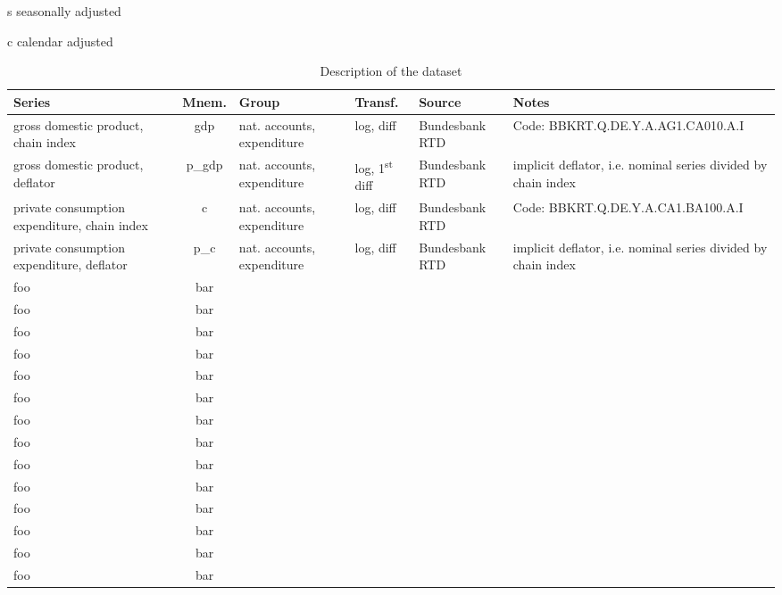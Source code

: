 \documentclass[notitlepage,a4paper,12pt]{article}
\begin{document}
\begingroup\fontsize{8}{10}\selectfont
\begin{ThreePartTable}
    \begin{TableNotes}
    \item[s] seasonally adjusted
    \item[c] calendar adjusted
    \end{TableNotes}
\begin{landscape}
\begin{longtable}{| l | c | l | l | l | l |} 
    \caption{Description of the dataset} \\%
    \toprule
    \rowcolor{gray!50}
    \textbf{Series} & \textbf{Mnem.} &  \textbf{Group} & \textbf{Transf.} & \textbf{Source} & \textbf{Notes} \\
    \midrule
    gross domestic product, chain index\tnote{s, c} & gdp &  nat. accounts, expenditure & log, diff  & Bundesbank RTD & Code: BBKRT.Q.DE.Y.A.AG1.CA010.A.I  \\ \hline 
    gross domestic product, deflator\tnote{s, c} & p\_gdp &  nat. accounts, expenditure &  log, 1\textsuperscript{st} diff  & Bundesbank RTD & implicit deflator, i.e. nominal series divided by chain index  \\ \hline 
    private consumption expenditure, chain index\tnote{s, c} & c &  nat. accounts, expenditure &  log, diff  & Bundesbank RTD & Code: BBKRT.Q.DE.Y.A.CA1.BA100.A.I  \\ \hline 
    private consumption expenditure, deflator\tnote{s, c} & p\_c &  nat. accounts, expenditure &  log, diff  & Bundesbank RTD & implicit deflator, i.e. nominal series divided by chain index  \\ \hline 
    foo & bar \\ \hline
    foo & bar \\ \hline
    foo & bar \\ \hline
    foo & bar \\ \hline
    foo & bar \\ \hline
    foo & bar \\ \hline 
    foo & bar \\ \hline
    foo & bar \\ \hline
    foo & bar \\ \hline
    foo & bar \\ \hline
    foo & bar \\ \hline
    foo & bar \\ \hline
    foo & bar \\ \hline
    foo & bar \\ \hline

\end{longtable}
\end{landscape}
\end{ThreePartTable}
\end{document}
